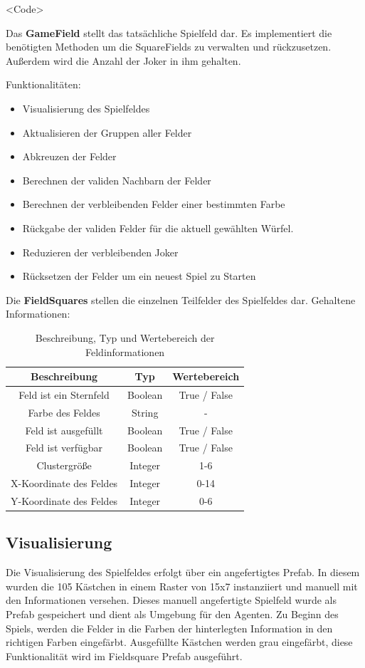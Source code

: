 <Code>

Das \textbf{GameField} stellt das tatsächliche Spielfeld dar.
Es implementiert die benötigten Methoden um die SquareFields zu verwalten und rückzusetzen.
Außerdem wird die Anzahl der Joker in ihm gehalten.

Funktionalitäten:
\begin{itemize}
	\item  Visualisierung des Spielfeldes
    \item  Aktualisieren der Gruppen aller Felder
    \item  Abkreuzen der Felder
    \item  Berechnen der validen Nachbarn der Felder
    \item  Berechnen der verbleibenden Felder einer bestimmten Farbe
    \item  Rückgabe der validen Felder für die aktuell gewählten Würfel.
    \item  Reduzieren der verbleibenden Joker
    \item  Rücksetzen der Felder um ein neuest Spiel zu Starten
\end{itemize}

Die \textbf{FieldSquares} stellen die einzelnen Teilfelder des Spielfeldes dar.
Gehaltene Informationen:
\begin{table}[htbp]
    \centering
    \begin{tabular}{|c|c|c|}
    \hline
    \textbf{Beschreibung} & \textbf{Typ} & \textbf{Wertebereich} \\
    \hline
    Feld ist ein Sternfeld & Boolean & True / False \\
    \hline
    Farbe des Feldes & String & - \\
    \hline
    Feld ist ausgefüllt & Boolean & True / False \\
    \hline
    Feld ist verfügbar & Boolean & True / False \\
    \hline
    Clustergröße & Integer & 1-6 \\
    \hline
    X-Koordinate des Feldes & Integer & 0-14 \\
    \hline
    Y-Koordinate des Feldes & Integer & 0-6 \\
    \hline
    \end{tabular}
    \caption{Beschreibung, Typ und Wertebereich der Feldinformationen}
    \label{tab:field_info}
\end{table}

\subsection{Visualisierung}
Die Visualisierung des Spielfeldes erfolgt über ein angefertigtes Prefab. In diesem wurden die 105 Kästchen in einem Raster von 15x7 instanziiert und manuell mit den Informationen versehen. Dieses manuell angefertigte Spielfeld wurde als Prefab gespeichert und dient als Umgebung für den Agenten.
Zu Beginn des Spiels, werden die Felder in die Farben der hinterlegten Information in den richtigen Farben eingefärbt. Ausgefüllte Kästchen werden grau eingefärbt, diese Funktionalität wird im Fieldsquare Prefab ausgeführt.

